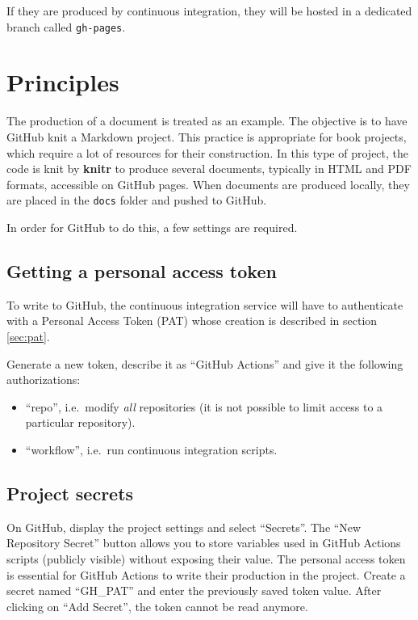 \documentclass[
  12pt,
  american,
  a4paper,
  extrafontsizes,onecolumn,openright
  ]{memoir}
\providecommand{\tightlist}{%
  \setlength{\itemsep}{0pt}\setlength{\parskip}{0pt}}
\begin{document}
If they are produced by continuous integration, they will be hosted in a dedicated branch called \texttt{gh-pages}.

\section{Principles}\label{principles}

The production of a document is treated as an example.
The objective is to have GitHub knit a Markdown project.
This practice is appropriate for book projects, which require a lot of resources for their construction.
In this type of project, the code is knit by \textbf{knitr} to produce several documents, typically in HTML and PDF formats, accessible on GitHub pages.
When documents are produced locally, they are placed in the \texttt{docs} folder and pushed to GitHub.

In order for GitHub to do this, a few settings are required.

\subsection{Getting a personal access token}\label{getting-a-personal-access-token}

To write to GitHub, the continuous integration service will have to authenticate with a Personal Access Token (PAT) whose creation is described in section \ref{sec:pat}.

Generate a new token, describe it as \enquote{GitHub Actions} and give it the following authorizations:

\begin{itemize}
\tightlist
\item
  \enquote{repo}, i.e.~modify \emph{all} repositories (it is not possible to limit access to a particular repository).
\item
  \enquote{workflow}, i.e.~run continuous integration scripts.
\end{itemize}

\subsection{Project secrets}\label{sec:secrets-ci}

On GitHub, display the project settings and select \enquote{Secrets}.
The \enquote{New Repository Secret} button allows you to store variables used in GitHub Actions scripts (publicly visible) without exposing their value.
The personal access token is essential for GitHub Actions to write their production in the project.
Create a secret named \enquote{GH\_PAT} and enter the previously saved token value.
After clicking on \enquote{Add Secret}, the token cannot be read anymore.
\end{document}
